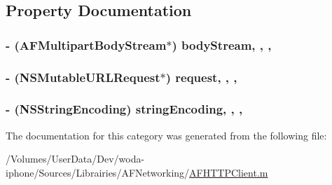 \subsection{Property Documentation}
\hypertarget{category_a_f_streaming_multipart_form_data_07_08_a41a2435c709facb4f2ae4e6ac644088e}{
\subsubsection[{body\-Stream}]{\setlength{\rightskip}{0pt plus 5cm}-\/ ({\bf A\-F\-Multipart\-Body\-Stream}$\ast$) body\-Stream\hspace{0.3cm}{\ttfamily [read]}, {\ttfamily [write]}, {\ttfamily [nonatomic]}, {\ttfamily [strong]}}}\label{category_a_f_streaming_multipart_form_data_07_08_a41a2435c709facb4f2ae4e6ac644088e}
\hypertarget{category_a_f_streaming_multipart_form_data_07_08_a2d0be87dd88432deeb33e4dfea850e48}{
\subsubsection[{request}]{\setlength{\rightskip}{0pt plus 5cm}-\/ (N\-S\-Mutable\-U\-R\-L\-Request$\ast$) request\hspace{0.3cm}{\ttfamily [read]}, {\ttfamily [write]}, {\ttfamily [nonatomic]}, {\ttfamily [copy]}}}\label{category_a_f_streaming_multipart_form_data_07_08_a2d0be87dd88432deeb33e4dfea850e48}
\hypertarget{category_a_f_streaming_multipart_form_data_07_08_aad982e1c61bf6c3416c3e4596dfdf07b}{
\subsubsection[{string\-Encoding}]{\setlength{\rightskip}{0pt plus 5cm}-\/ (N\-S\-String\-Encoding) string\-Encoding\hspace{0.3cm}{\ttfamily [read]}, {\ttfamily [write]}, {\ttfamily [nonatomic]}, {\ttfamily [assign]}}}\label{category_a_f_streaming_multipart_form_data_07_08_aad982e1c61bf6c3416c3e4596dfdf07b}


The documentation for this category was generated from the following file\-:\begin{DoxyCompactItemize}
\item 
/\-Volumes/\-User\-Data/\-Dev/woda-\/iphone/\-Sources/\-Librairies/\-A\-F\-Networking/\hyperlink{_a_f_h_t_t_p_client_8m}{A\-F\-H\-T\-T\-P\-Client.\-m}\end{DoxyCompactItemize}
